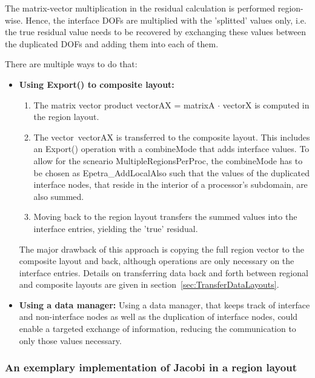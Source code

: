 \documentclass[11pt]{article}
\begin{document}
The matrix-vector multiplication in the residual calculation is performed region-wise. 
Hence, the interface DOFs are multiplied with the 'splitted' values only, i.e. the true residual value needs to be recovered 
by exchanging these values between the duplicated DOFs and adding them into each of them.

There are multiple ways to do that:
\begin{itemize}
\item {\bf Using {\sf Export()} to composite layout:} 
\begin{enumerate}
 \item The matrix vector product {\sf vectorAX = matrixA $\cdot$ vectorX} is computed in the region layout. 
 \item The vector~{\sf vectorAX} is transferred to the composite layout. This includes an {\sf Export()} operation with a {\sf combineMode} 
 that adds interface values. To allow for the scneario {\sf MultipleRegionsPerProc}, the {\sf combineMode} has to be chosen 
 as {\sf Epetra\_AddLocalAlso} such that the values of the duplicated interface nodes, that reside in the interior of a processor's subdomain, 
 are also summed.
 \item Moving back to the region layout transfers the summed values into the interface entries, yielding the 'true' residual. 
\end{enumerate}

The major drawback of this approach is copying the full region vector to the composite layout and back, 
although operations are only necessary on the interface entries. 
Details on transferring data back and forth between regional and composite layouts are given in section~\ref{sec:TransferDataLayouts}.
\item {\bf Using a data manager:} Using a data manager, that keeps track of interface and non-interface nodes as well as the duplication of interface nodes,
could enable a targeted exchange of information, reducing the communication to only those values necessary.
\end{itemize}

\subsubsection{An exemplary implementation of Jacobi in a region layout}
\end{document}
